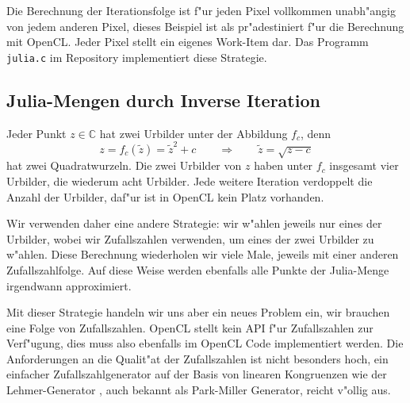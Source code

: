 \begin{refsection}
Die Berechnung der Iterationsfolge ist f"ur jeden Pixel vollkommen
unabh"angig von jedem anderen Pixel, dieses Beispiel ist als pr"adestiniert
f"ur die Berechnung mit OpenCL.
Jeder Pixel stellt ein eigenes Work-Item dar.
Das Programm {\tt julia.c} im Repository implementiert diese Strategie.


\subsection{Julia-Mengen durch Inverse Iteration}
Jeder Punkt $z\in\mathbb C$ hat zwei Urbilder unter der Abbildung $f_c$,
denn
\[
z=f_c(\tilde z)=\tilde z^2+c
\qquad\Rightarrow\qquad
\tilde z=\sqrt{z-c}
\]
hat zwei Quadratwurzeln. 
Die zwei Urbilder von $z$ haben unter $f_c$ insgesamt vier Urbilder, 
die wiederum acht Urbilder.
Jede weitere Iteration verdoppelt die Anzahl der Urbilder, daf"ur ist
in OpenCL kein Platz vorhanden.

Wir verwenden daher eine andere Strategie: wir w"ahlen jeweils nur eines
der Urbilder, wobei wir Zufallszahlen verwenden, um eines der zwei
Urbilder zu w"ahlen.
Diese Berechnung wiederholen wir viele Male, jeweils mit einer anderen
Zufallszahlfolge.
Auf diese Weise werden ebenfalls alle Punkte der Julia-Menge irgendwann
approximiert.

Mit dieser Strategie handeln wir uns aber ein neues Problem ein, wir brauchen
eine Folge von Zufallszahlen.
OpenCL stellt kein API f"ur Zufallszahlen zur Verf"ugung, dies muss also
ebenfalls im OpenCL Code implementiert werden.
Die Anforderungen an die Qualit"at der Zufallszahlen ist nicht besonders
hoch, ein einfacher Zufallszahlgenerator auf der Basis von linearen
Kongruenzen wie der Lehmer-Generator \cite{julia:lehmer},
auch bekannt als Park-Miller Generator, reicht v"ollig aus.


\end{refsection}
